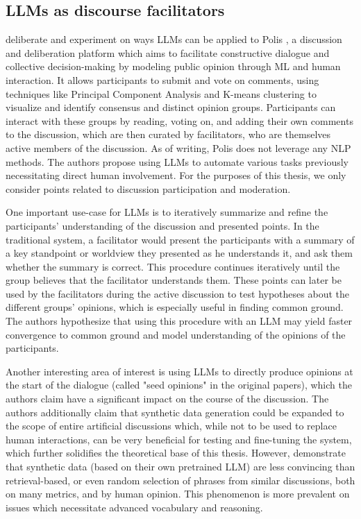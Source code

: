 \subsection{LLMs as discourse facilitators}
\label{sec:related:discource}

\cite{small-polis-llm} deliberate and experiment on ways LLMs can be applied to Polis \cite{small2021polis}, a discussion and deliberation platform which aims to facilitate constructive dialogue and collective decision-making by modeling public opinion through \ac{ML} and human interaction. It allows participants to submit and vote on comments, using techniques like Principal Component Analysis and K-means clustering to visualize and identify consensus and distinct opinion groups. Participants can interact with these groups by reading, voting on, and adding their own comments to the discussion, which are then curated by facilitators, who are themselves active members of the discussion. As of writing, Polis does not leverage any \ac{NLP} methods. The authors propose using LLMs to automate various tasks previously necessitating direct human involvement. For the purposes of this thesis, we only consider points related to discussion participation and moderation. 

One important use-case for LLMs is to iteratively summarize and refine the participants' understanding of the discussion and presented points. In the traditional system, a facilitator would present the participants with a summary of a key standpoint or worldview they presented as he understands it, and ask them whether the summary is correct. This procedure continues iteratively until the group believes that the facilitator understands them. These points can later be used by the facilitators during the active discussion to test hypotheses about the different groups' opinions, which is especially useful in finding common ground. The authors hypothesize that using this procedure with an LLM may yield faster convergence to common ground and model understanding of the opinions of the participants.

Another interesting area of interest is using LLMs to directly produce opinions at the start of the dialogue (called "seed opinions" in the original papers), which the authors claim have a significant impact on the course of the discussion. The authors additionally claim that synthetic data generation could be expanded to the scope of entire artificial discussions which, while not to be used to replace human interactions, can be very beneficial for testing and fine-tuning the system, which further solidifies the theoretical base of this thesis. However, \cite{karadzhov2023delidata} demonstrate that synthetic data (based on their own pretrained LLM) are less convincing than retrieval-based, or even random selection of phrases from similar discussions, both on many metrics, and by human opinion. This phenomenon is more prevalent on issues which necessitate advanced vocabulary and reasoning.

